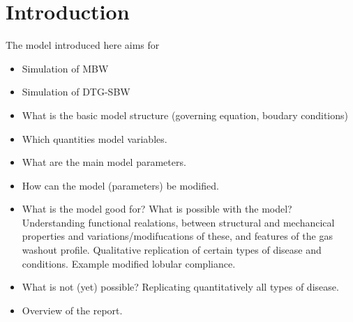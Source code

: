 \chapter*{Introduction}\label{cha:Introduction}
The model introduced here aims for
\begin{itemize}
  \item Simulation of MBW
  \item Simulation of DTG-SBW
  \item What is the basic model structure (governing equation, boudary conditions)
  \item Which quantities model variables.
  \item What are the main model parameters.
  \item How can the model (parameters) be modified.
  \item What is the model good for? What is possible with the model? Understanding functional realations, between structural and mechancical properties and variations/modifucations of these, and features of the gas washout profile. Qualitative replication of certain types of disease and conditions. Example modified lobular compliance.
  \item What is not (yet) possible? Replicating quantitatively all types of disease.
  \item Overview of the report.
\end{itemize}
